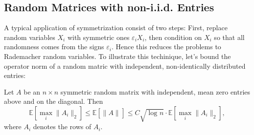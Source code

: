 \subsection{Random Matrices with non-i.i.d. Entries}
A typical application of symmetrization consist of two steps: First, replace random variables $X_i$ with 
symmetric ones $\varepsilon_i X_i$, then condition on $X_i$ so that all randomness comes from the signs 
$\varepsilon_i$. Hence this reduces the problems to Rademacher random variables. To illustrate this techinique, 
let's bound the operator norm of a random matric with independent, non-identically distributed entries:

\begin{theorem}
\label{thm:6.4.1}
Let $A$ be an $n \times n$ symmetric random matrix with independent, mean zero entries above and on the 
diagonal. Then 
\[ \mathbb{E}\left[ \max_{i} \lVert A_i \rVert_{2} \right] \leq \mathbb{E}\left[ \lVert A \rVert_{} \right] 
\leq C \sqrt{\log_{}{n}} \cdot \mathbb{E}\left[ \max_{i} \lVert A_i \rVert_{2} \right], \]
where $A_i$ denotes the rows of $A_i$.
\end{theorem}

